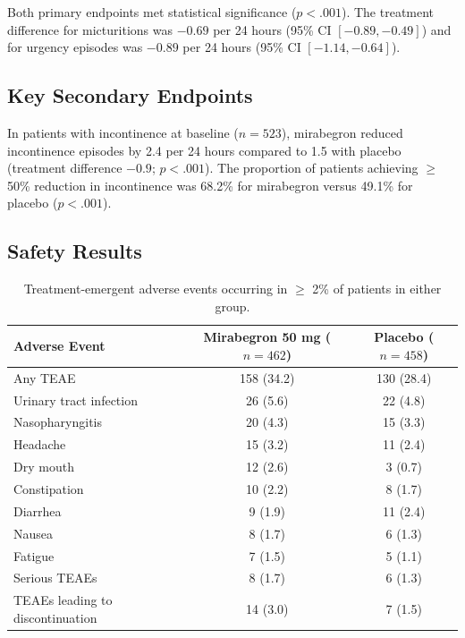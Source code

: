 \documentclass[
    language=english,
    doctype=clinical-report,
    institution=none,
]{../../omnilatex}
\begin{document}
Both primary endpoints met statistical significance ($p < .001$). The
treatment difference for micturitions was $-0.69$ per 24 hours (95\% CI
$[-0.89, -0.49]$) and for urgency episodes was $-0.89$ per 24 hours
(95\% CI $[-1.14, -0.64]$).

\subsection{Key Secondary Endpoints}

In patients with incontinence at baseline ($n = 523$), mirabegron reduced
incontinence episodes by 2.4 per 24 hours compared to 1.5 with placebo
(treatment difference $-0.9$; $p < .001$). The proportion of patients
achieving $\geq$ 50\% reduction in incontinence was 68.2\% for mirabegron
versus 49.1\% for placebo ($p < .001$).

\subsection{Safety Results}

\begin{table}[htbp]
    \centering
    \caption{Treatment-emergent adverse events occurring in $\geq$ 2\% of
             patients in either group.}
    \label{tab:safety}
    \begin{tabular}{@{}lcc@{}}
        \toprule
        Adverse Event & Mirabegron 50 mg ($n = 462$) & Placebo ($n = 458$) \\
        \midrule
        Any TEAE & 158 (34.2) & 130 (28.4) \\
        Urinary tract infection & 26 (5.6) & 22 (4.8) \\
        Nasopharyngitis & 20 (4.3) & 15 (3.3) \\
        Headache & 15 (3.2) & 11 (2.4) \\
        Dry mouth & 12 (2.6) & 3 (0.7) \\
        Constipation & 10 (2.2) & 8 (1.7) \\
        Diarrhea & 9 (1.9) & 11 (2.4) \\
        Nausea & 8 (1.7) & 6 (1.3) \\
        Fatigue & 7 (1.5) & 5 (1.1) \\
        \midrule
        Serious TEAEs & 8 (1.7) & 6 (1.3) \\
        TEAEs leading to discontinuation & 14 (3.0) & 7 (1.5) \\
        \bottomrule
    \end{tabular}
\end{table}
\end{document}
